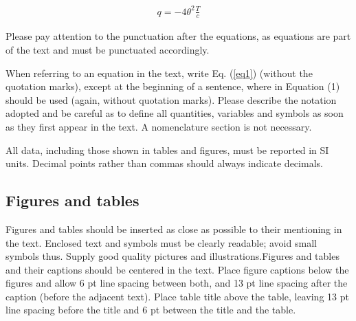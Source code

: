\documentclass{cilamce19}
\begin{document}
\begin{eqnarray}
q =-4 \theta^{2} \frac{T}{c}
\label{eq1}
\end{eqnarray}

Please pay attention to the punctuation after the equations, as equations are part of the text and must be punctuated accordingly.

When referring to an equation in the text, write Eq. (\ref{eq1}) (without the quotation marks), except at the beginning of a sentence, where in  Equation (1) should be used (again, without quotation marks). Please describe the notation adopted and be careful as to define all quantities, variables and symbols as soon as they first appear in the text. A nomenclature section is not necessary.

All data, including those shown in tables and figures, must be reported in SI units. Decimal points rather than commas should always indicate decimals.


\subsection{Figures and tables}

Figures and tables should be inserted as close as possible to their mentioning in the text. Enclosed text and symbols must be clearly readable; avoid small symbols thus. Supply good quality pictures and illustrations.Figures and tables and their captions should be centered in the text. Place figure captions below the figures and allow 6 pt line spacing between both, and 13 pt line spacing after the caption (before the adjacent text). Place table title above the table, leaving 13 pt line spacing before the title and 6 pt between the title and the table.
\end{document}
